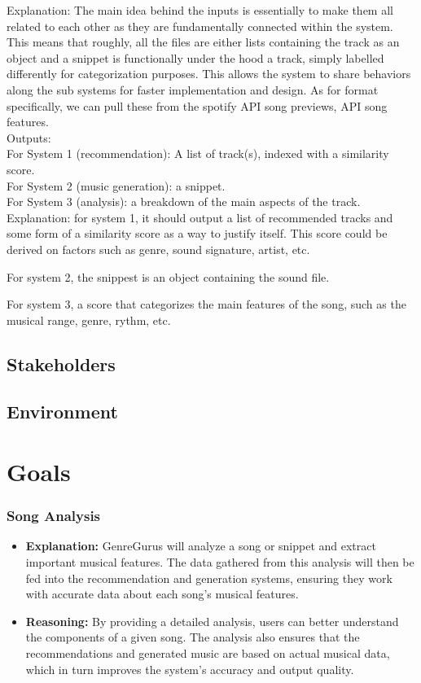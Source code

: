 \documentclass{article}
\begin{document}
Explanation: The main idea behind the inputs is essentially to make them all related to each other as they are
fundamentally connected within the system. This means that roughly, all the files are either lists containing
the track as an object and a snippet is functionally under the hood a track, simply labelled differently for
categorization purposes. This allows the system to share behaviors along the sub systems for 
faster implementation and design. As for format specifically, we can pull these from the spotify API song previews,
API song features. \\

Outputs: \\
For System 1 (recommendation): A list of track(s), indexed with a similarity score. \\
For System 2 (music generation): a snippet. \\
For System 3 (analysis): a breakdown of the main aspects of the track.\\

Explanation: for system 1, it should output a list of recommended tracks and some form of a similarity score
as a way to justify itself. This score could be derived on factors such as genre, sound signature, artist, etc.

For system 2, the snippest is an object containing the sound file. 

For system 3, a score that categorizes the main features of the song, such as the musical range, genre, rythm, etc. \\

\subsection{Stakeholders}

\subsection{Environment}


\section{Goals}
\subsubsection*{Song Analysis}
\begin{itemize}
    \item \textbf{Explanation:} GenreGurus will analyze a song or snippet and extract important musical features. The data gathered from this analysis will then be fed into the recommendation and generation systems, ensuring they work with accurate data about each song's musical features.
    \item \textbf{Reasoning:} By providing a detailed analysis, users can better understand the components of a given song. The analysis also ensures that the recommendations and generated music are based on actual musical data, which in turn improves the system’s accuracy and output quality.
\end{itemize}
\end{document}
